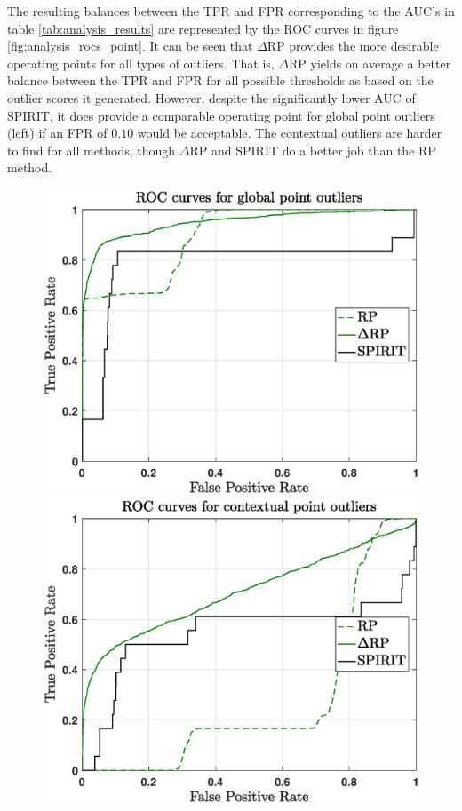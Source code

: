 The resulting balances between the TPR and FPR corresponding to the AUC's in table \ref{tab:analysis_results} are represented by the ROC curves in figure \ref{fig:analysis_rocs_point}. 
It can be seen that $\Delta$RP provides the more desirable operating points for all types of outliers. That is, $\Delta$RP yields on average a better balance between the TPR and FPR for all possible thresholds as based on the outlier scores it generated. However, despite the significantly lower AUC of SPIRIT, it does provide a comparable operating point for global point outliers (left) if an FPR of $0.10$ would be acceptable. The contextual outliers are harder to find for all methods, though $\Delta$RP and SPIRIT do a better job than the RP method. 

\vspace{0.1cm}
\begin{figure}[h]
	\begin{minipage}{0.333\textwidth}
		\centering
		\includegraphics[scale=0.28]{analysis/ROCs_point}
	\end{minipage}
	\begin{minipage}{0.333\textwidth}
		\centering
		\includegraphics[scale=0.28]{analysis/ROCs_contextual}

\end{minipage}
\end{figure}
